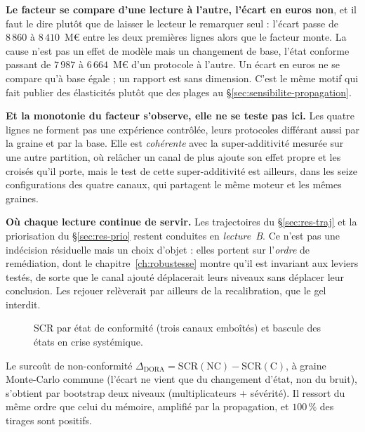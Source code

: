 \begin{attention}
\textbf{Le facteur se compare d'une lecture à l'autre, l'écart en euros non}, et il faut le dire
plutôt que de laisser le lecteur le remarquer seul : l'écart passe de $8\,860$ à $8\,410$~M\euro{}
entre les deux premières lignes alors que le facteur monte. La cause n'est pas un effet de modèle
mais un changement de base, l'état conforme passant de $7\,987$ à $6\,664$~M\euro{} d'un
protocole à l'autre. Un écart en euros ne se compare qu'à base égale ; un rapport est sans
dimension. C'est le même motif qui fait publier des élasticités plutôt que des plages au
\S\ref{sec:sensibilite-propagation}.

\textbf{Et la monotonie du facteur s'observe, elle ne se teste pas ici.} Les quatre lignes ne
forment pas une expérience contrôlée, leurs protocoles différant aussi par la graine et par la
base. Elle est \emph{cohérente} avec la super-additivité mesurée sur une autre partition, où
relâcher un canal de plus ajoute son effet propre et les croisés qu'il porte, mais le test de
cette super-additivité est ailleurs, dans les seize configurations des quatre canaux, qui
partagent le même moteur et les mêmes graines.
\end{attention}

\noindent\textbf{Où chaque lecture continue de servir.} Les trajectoires du
\S\ref{sec:res-traj} et la priorisation du \S\ref{sec:res-prio} restent conduites en
\emph{lecture~B}. Ce n'est pas une indécision résiduelle mais un choix d'objet : elles portent
sur l'\emph{ordre} de remédiation, dont le chapitre~\ref{ch:robustesse} montre qu'il est
invariant aux leviers testés, de sorte que le canal ajouté déplacerait leurs niveaux sans
déplacer leur conclusion. Les rejouer relèverait par ailleurs de la recalibration, que le gel
interdit.

\begin{figure}[htbp]\centering
{}
\caption{SCR par état de conformité (trois canaux emboîtés) et bascule des états en crise
systémique.}
\label{fig:multietats}
\end{figure}

Le surcoût de non-conformité $\Delta_{\text{DORA}}=\mathrm{SCR}(\text{NC})-\mathrm{SCR}(\text{C})$,
à graine Monte-Carlo commune (l'écart ne vient que du changement d'état, non du bruit),
s'obtient par bootstrap deux niveaux (multiplicateurs $+$ sévérité). Il ressort du même ordre
que celui du mémoire, amplifié par la propagation, et $100\,\%$ des tirages sont
positifs.

